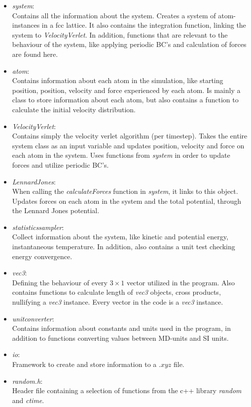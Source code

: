 		\begin{itemize}

			\item \textit{system}:\\
				Contains all the information about the system. Creates a system of atom-instances in a fcc lattice. It also contains the integration function, linking the system to \textit{VelocityVerlet}. In addition, functions that are relevant to the behaviour of the system, like applying periodic BC's and calculation of forces are found here. 
				
			\item \textit{atom}:	\\
				Contains information about each atom in the simulation, like starting position,  position, velocity and force experienced by each atom. Is mainly a class to store information about each atom, but also contains a function to calculate the initial velocity distribution.
			
			\item \textit{VelocityVerlet}:\\
					Contains simply the velocity verlet algorithm (per timestep). Takes the entire system class as an input variable and updates position, velocity and force on each atom in the system. Uses functions from \textit{system} in order to update forces and utilize periodic BC's. 
						
			\item \textit{LennardJones}:\\
				When calling the \textit{calculateForces} function in \textit{system}, it links to this object. Updates forces on each atom in the system and the total potential, through the Lennard Jones potential.
				
			\item \textit{statisticssampler}:\\
				Collect information about the system, like kinetic and potential energy, instantaneous temperature. In addition, also contains a unit test checking energy convergence. 
			
			\item 	\textit{vec3}:\\
				Defining the behaviour of every $ 3\times 1 $ vector utilized in the program.  Also contains functions to calculate length of  \textit{vec3} objects, cross products, nullifying a \textit{vec3}  instance. Every vector in the code is a \textit{vec3} instance.
				
			\item \textit{unitconverter}:\\
				Contains information about  constants and units used in the program, in addition to functions converting values between MD-units and SI units. 
			

			\item \textit{io}:\\
				Framework to create and store information to a $ .xyz $ file. 
			\item 	\textit{random.h}:	\\
				Header file containing a selection of functions from the c++ library \textit{random} and \textit{ctime}.
		\end{itemize}


